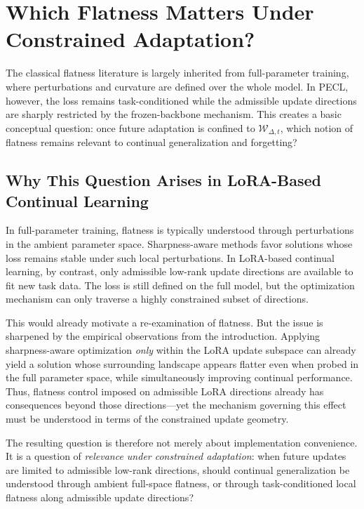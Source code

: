\section{Which Flatness Matters Under Constrained Adaptation?}
\label{sec:which-flatness}

The classical flatness literature is largely inherited from full-parameter training, where perturbations and curvature are defined over the whole model.
In PECL, however, the loss remains task-conditioned while the admissible update directions are sharply restricted by the frozen-backbone mechanism.
This creates a basic conceptual question: once future adaptation is confined to $\mathcal{W}_{\Delta,t}$, which notion of flatness remains relevant to continual generalization and forgetting?

\subsection{Why This Question Arises in LoRA-Based Continual Learning}
\label{sec:flatness-question}

In full-parameter training, flatness is typically understood through perturbations in the ambient parameter space.
Sharpness-aware methods favor solutions whose loss remains stable under such local perturbations.
In LoRA-based continual learning, by contrast, only admissible low-rank update directions are available to fit new task data.
The loss is still defined on the full model, but the optimization mechanism can only traverse a highly constrained subset of directions.

This would already motivate a re-examination of flatness.
But the issue is sharpened by the empirical observations from the introduction.
Applying sharpness-aware optimization \emph{only} within the LoRA update subspace can already yield a solution whose surrounding landscape appears flatter even when probed in the full parameter space, while simultaneously improving continual performance.
Thus, flatness control imposed on admissible LoRA directions already has consequences beyond those directions---yet the mechanism governing this effect must be understood in terms of the constrained update geometry.

The resulting question is therefore not merely about implementation convenience.
It is a question of \emph{relevance under constrained adaptation}: when future updates are limited to admissible low-rank directions, should continual generalization be understood through ambient full-space flatness, or through task-conditioned local flatness along admissible update directions?


